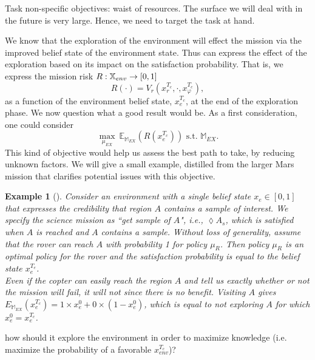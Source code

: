 \documentclass[conference]{IEEEtran}
\newtheorem{example}{Example}
\begin{document}
Task non-specific objectives: waist of resources. The surface we will deal with in the future is very large. Hence, we need to target the task at hand. 

We know that the exploration of the environment will effect the mission via the improved belief state of the environment state.
Thus can express the effect of the exploration based on its impact on the satisfaction probability. That is, we express the mission risk $R:\mathbb{X}_{env}\rightarrow [0,1]$ 
\begin{equation}
	R(\cdot) = V_r(x^{T_c}_r, \cdot, x^{T_c}_\varphi),
\end{equation}
as a function of the environment belief state,  $x_e^{T_c}$,  at the end of the exploration phase.
We now question what a good result would be. 
As a first consideration, one could consider
\begin{equation}
	\max_{\mu_{EX}}\  \mathbb E_{\mathbb M_{EX}} (R(x^{T_c}_e)  ) \mbox{ s.t.  }\mathbb M_{EX}.
\end{equation}
 This kind of objective would help us assess the best path to take, by reducing unknown factors.  We will give a small example, distilled from the larger Mars mission that clarifies potential issues with this objective.
\begin{example}[]
	Consider an environment with a single belief state $x_e\in[0,1]$ that expresses the credibility that region $A$ contains a sample of interest.
	We specify the science mission as  ``\emph{get  sample of $A$}", i.e.,  $\lozenge A_s$, which is satisfied when $A$ is reached and $A$ contains a sample.
	Without loss of generality, assume that the rover can reach $A$ with probability 1 for policy $\mu_R$. Then policy $\mu_R$ is an optimal policy for the rover and the satisfaction probability is equal to the belief state $x_e^{T_e}$.
	\\
Even if the copter can easily reach the region $A$ and tell us exactly whether or not the mission will fail, it will not since there is no benefit. 
Visiting $A$ gives $E_{\mathbb M_{EX}} (x^{T_c}_e ) = 1\times x_e^{0} +  0\times (1- x_e^{0})$, which is equal to not exploring $A$ for which $ x_e^{0}= x_e^{T_c}$.

\end{example} 
 
 
 how should it explore the environment in order to maximize knowledge (i.e. maximize the probability of a favorable $x_{env}^{T_c}$)?


\end{document}
